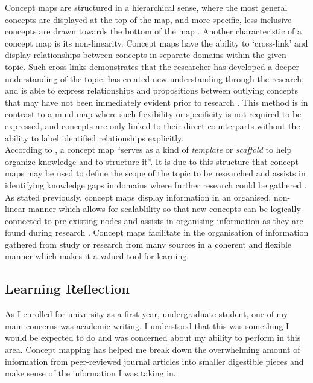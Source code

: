 \documentclass[12pt,a4paper]{report}
\begin{document}
Concept maps are structured in a hierarchical sense, where the most general concepts are displayed at the top of the map, and more specific, less inclusive concepts are drawn towards the bottom of the map \citep{Novak2006}. Another characteristic of a concept map is its non-linearity. Concept maps have the ability to `cross-link' and display relationships between concepts in separate domains within the given topic. Such cross-links demonstrates that the researcher has developed a deeper understanding of the topic, has created new understanding through the research, and is able to express relationships and propositions between outlying concepts that may have not been immediately evident prior to research \citep{Novak2006}. This method is in contrast to a mind map where such flexibility or specificity is not required to be expressed, and concepts are only linked to their direct counterparts without the ability to label identified relationships explicitly.\\

According to \citet[pp.1]{Novak2006}, a concept map ``serves as a kind of \emph{template} or \emph{scaffold} to help organize knowledge and to structure it''. It is due to this structure that concept maps may be used to define the scope of the topic to be researched and assists in identifying knowledge gaps in domains where further research could be gathered \citep{Novak2006}. As stated previously, concept maps display information in an organised, non-linear manner which allows for scalablility so that new concepts can be logically connected to pre-existing nodes and assists in organising information as they are found during research \citep{Novak2006}. Concept maps facilitate in the organisation of information gathered from study or research from many sources in a coherent and flexible manner which makes it a valued tool for learning.

\newpage
\subsection*{\textsf{Learning Reflection}}
As I enrolled for university as a first year, undergraduate student, one of my main concerns was academic writing. I understood that this was something I would be expected to do and was concerned about my ability to perform in this area. Concept mapping has helped me break down the overwhelming amount of information from peer-reviewed journal articles into smaller digestible pieces and make sense of the information I was taking in.\\
\end{document}
